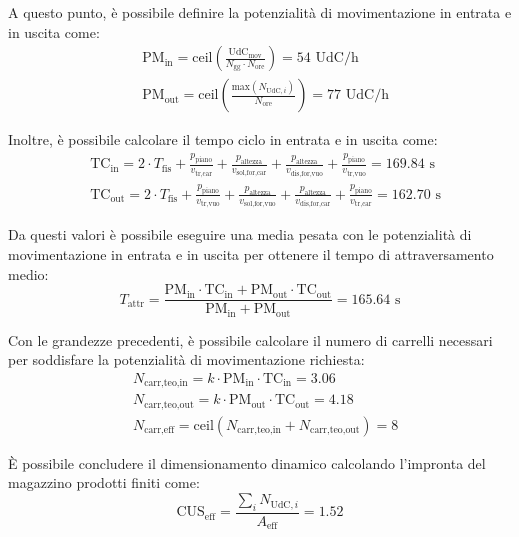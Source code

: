 \documentclass[11pt]{article}
\begin{document}
\noindent
A questo punto, è possibile definire la potenzialità di movimentazione in entrata e in uscita come:
\begin{align}
    & \text{PM}_\text{in} = \text{ceil}\left(\frac{\text{UdC}_\text{mov}}{N_\text{gg} \cdot N_\text{ore}}\right) = 54 \text{ UdC/h} \\
    & \text{PM}_\text{out} = \text{ceil}\left(\frac{\text{max}(N_{\text{UdC},i})}{N_\text{ore}}\right) = 77 \text{ UdC/h}
\end{align}

\newpage
\noindent
Inoltre, è possibile calcolare il tempo ciclo in entrata e in uscita come:
\begin{align}
    & \text{TC}_\text{in} = 2 \cdot T_\text{fis} + \frac{p_\text{piano}}{v_\text{tr,car}} + \frac{p_\text{altezza}}{v_\text{sol,for,car}} + \frac{p_\text{altezza}}{v_\text{dis,for,vuo}} + \frac{p_\text{piano}}{v_\text{tr,vuo}} = 169.84 \text{ s} \\
    & \text{TC}_\text{out} = 2 \cdot T_\text{fis} + \frac{p_\text{piano}}{v_\text{tr,vuo}} + \frac{p_\text{altezza}}{v_\text{sol,for,vuo}} + \frac{p_\text{altezza}}{v_\text{dis,for,car}} + \frac{p_\text{piano}}{v_\text{tr,car}} = 162.70 \text{ s}
\end{align}

\noindent
Da questi valori è possibile eseguire una media pesata con le potenzialità di movimentazione in entrata e in uscita per ottenere il tempo di attraversamento medio:
\begin{equation}
    T_\text{attr} = \frac{\text{PM}_\text{in} \cdot \text{TC}_\text{in} + \text{PM}_\text{out} \cdot \text{TC}_\text{out}}{\text{PM}_\text{in} + \text{PM}_\text{out}} = 165.64 \text{ s}
\end{equation}

\noindent
Con le grandezze precedenti, è possibile calcolare il numero di carrelli necessari per soddisfare la potenzialità di movimentazione richiesta:
\begin{align}
    & N_\text{carr,teo,in} = k \cdot \text{PM}_\text{in} \cdot \text{TC}_\text{in} = 3.06 \\
    & N_\text{carr,teo,out} = k \cdot \text{PM}_\text{out} \cdot \text{TC}_\text{out} = 4.18 \\
    & N_\text{carr,eff} = \text{ceil}\left(N_\text{carr,teo,in} + N_\text{carr,teo,out}\right) = 8
\end{align}

\noindent
È possibile concludere il dimensionamento dinamico calcolando l'impronta del magazzino prodotti finiti come:
\begin{equation}
    \text{CUS}_\text{eff} = \frac{\sum_i N_{\text{UdC},i}}{A_\text{eff}} = 1.52
\end{equation}
\end{document}
